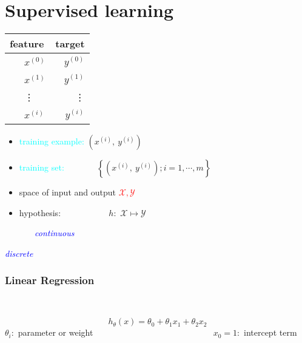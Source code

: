 \documentclass[a4paper, 12pt]{article}
\begin{document}
\part*{Supervised learning}
\begin{center}
    \begin{tabular}{ l | r }		
        \textbf{feature} & \textbf{target} \\\hline
        ~~~$x^{(0)}$ & $y^{(0)}$ \\ 
        ~~~$x^{(1)}$ & $y^{(1)}$ \\
        ~~~\vdots    & \vdots \\ 
        ~~~$x^{(i)}$ & $y^{(i)}$
    \end{tabular}
\end{center}
\begin{itemize}
    \item \textcolor{cyan}{training example: }    $(x^{(i)},~y^{(i)})$
    \item \textcolor{cyan}{training set: } ~~~~~~~$\left\{(x^{(i)},~y^{(i)});i = 1, \cdots, m\right\}$
    \item space of input and output               \textcolor{red}{$\mathcal{X}, \mathcal{Y}$}
    \item hypothesis: ~~~~~~~~~~                  $h: $ $\mathcal{X} \mapsto \mathcal{Y}$
\end{itemize}\par\par
\begin{description}[align=left]
\item [\textbf{REGRESSION}] ~~~~~~~\textit{\textcolor{blue}{continuous}}
\item [\textbf{CLASSIFICATION}]    \textit{\textcolor{blue}{discrete}}
\end{description}
\section{Linear Regression}
  \\


\begin{tcolorbox}[colback=red!5!white,colframe=red!75!black]
    \begin{equation}
        h_\theta(x) = \theta_{0} + \theta_{1}x_{1} + \theta_{2}x_{2}
    \end{equation}
   \tcblower
  $\theta_{i}: $ parameter or weight ~~~~~~~~~~~~~~~~~~~~~~~~~~~ $x_{0} = 1: $ intercept term
\end{tcolorbox}
\end{document}
